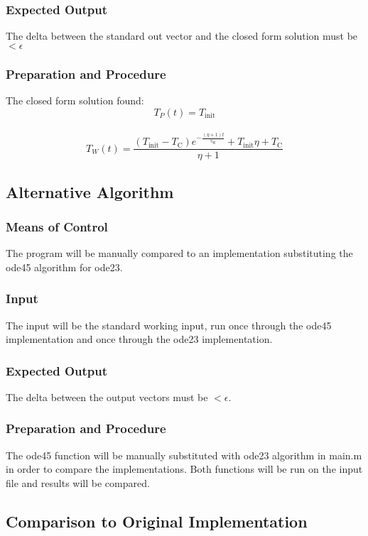\documentclass[12pt]{article}
\begin{document}
\subsubsection{Expected Output}
The delta between the standard out vector and the closed form solution must be
$< \epsilon$

\subsubsection{Preparation and Procedure}
The closed form solution found:
$$ T_P(t) = T_{\text{init}}$$
\\
$$T_W(t) = \frac{(T_{\text{init}}-T_{\text{C}})e^{-\frac{(\eta+1)t}{\tau_{\text{W}}}}+T_{\text{init}}\eta+T_{\text{C}}}{\eta+1}
$$



\subsection{Alternative Algorithm}
\subsubsection{Means of Control}
The program will be manually compared to an implementation substituting the ode45
 algorithm for ode23. 

\subsubsection{Input}
The input will be the standard working input, run once through the ode45
implementation and once through the ode23 implementation.

\subsubsection{Expected Output}
The delta between the output vectors must be 
$< \epsilon$.

\subsubsection{Preparation and Procedure}
The ode45 function will be manually substituted with ode23 algorithm in main.m
in order to compare the implementations. Both functions will be run on the input
file and results will be compared.

\subsection{Comparison to Original Implementation}
\end{document}
